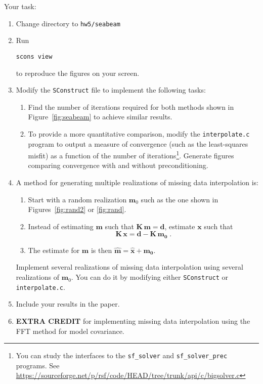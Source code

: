 
\lstset{language=c,numbers=left,numberstyle=\tiny,showstringspaces=false}



\lstset{language=python,numbers=left,numberstyle=\tiny,showstringspaces=false}


Your task:
\begin{enumerate}
\item Change directory to \texttt{hw5/seabeam}
\item Run 
\begin{verbatim}
scons view
\end{verbatim}
to reproduce the figures on your screen.
\item Modify the \texttt{SConstruct} file to implement the following tasks:
\begin{enumerate}
\item Find the number of iterations required for both methods shown in Figure~\ref{fig:seabeam} to achieve similar results.
\item To provide a more quantitative comparison, modify the
\texttt{interpolate.c} program to output a measure of convergence
(such as the least-squares misfit) as a function of the number
of iterations\footnote{You can study the interfaces to
the \texttt{sf\_solver} and
\texttt{sf\_solver\_prec} programs. See
\url{https://sourceforge.net/p/rsf/code/HEAD/tree/trunk/api/c/bigsolver.c}}. Generate figures comparing convergence with and without preconditioning.
\end{enumerate}
\item A method for generating multiple realizations of missing data interpolation is:
\begin{enumerate}
\item Start with a random realization $\mathbf{m}_0$ such as the one shown in Figures~\ref{fig:rand2} or \ref{fig:rand}.
\item Instead of estimating $\mathbf{m}$ such that $\mathbf{K}\,\mathbf{m} = \mathbf{d}$, 
      estimate $\mathbf{x}$ such that 
\[
\mathbf{K}\,\mathbf{x} = \mathbf{d}- \mathbf{K}\,\mathbf{m_0}\;.
\]
\item The estimate for $\mathbf{m}$ is then  $\widehat{\mathbf{m}} = \widehat{\mathbf{x}}+\mathbf{m_0}$.
\end{enumerate}
Implement several realizations of missing data interpolation using
several realizations of $\mathbf{m}_0$. You can do it by modifying
either \texttt{SConstruct} or \texttt{interpolate.c}.
\item Include your results in the paper.
\item \textbf{EXTRA CREDIT} for implementing missing data interpolation using the FFT method for model covariance.
\end{enumerate}


